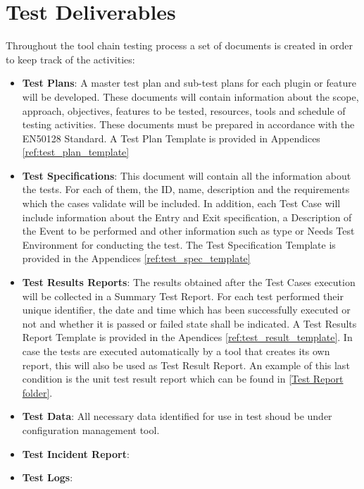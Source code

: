 \section{Test Deliverables}
Throughout the tool chain testing process a set of documents is created in order to keep track of the activities:
\begin{itemize}
\item \textbf{Test Plans}: A master test plan and sub-test plans for each plugin or feature will be developed. These documents will contain information about the scope, approach, objectives, features to be tested, resources, tools and schedule of testing activities.  These documents must be prepared in accordance with the EN50128 Standard. A Test Plan Template is provided in Appendices \ref{ref:test_plan_template}
\item \textbf{Test Specifications}: This document will contain all the information about the tests. For each of them, the ID, name, description and the requirements which the cases validate will be included. In addition, each Test Case will include information about the Entry and Exit specification, a Description of the Event to be performed and other information such as type or Needs Test Environment for conducting the test. The Test Specification Template is provided in the Appendices \ref{ref:test_spec_template}
\item \textbf{Test Results Reports}: The results obtained after the Test Cases execution will be collected in a Summary Test Report. For each test performed their unique identifier, the date and time which has been successfully executed or not and whether it is passed or failed state shall be indicated. A Test Results Report Template is provided in the Apendices \ref{ref:test_result_template}. In case the tests are executed automatically by a tool that creates its own report, this will also be used as Test Result Report. An example of this last condition is the unit test result report which can be found in \href{https://openetcs.ci.cloudbees.com/job/openETCS-tycho/lastBuild/testReport/}{[Test Report folder]}.
\item \textbf{Test Data}: All necessary data identified for use in test shoud be under configuration management tool.
\item \textbf{Test Incident Report}:
\item \textbf{Test Logs}:
\end{itemize}

